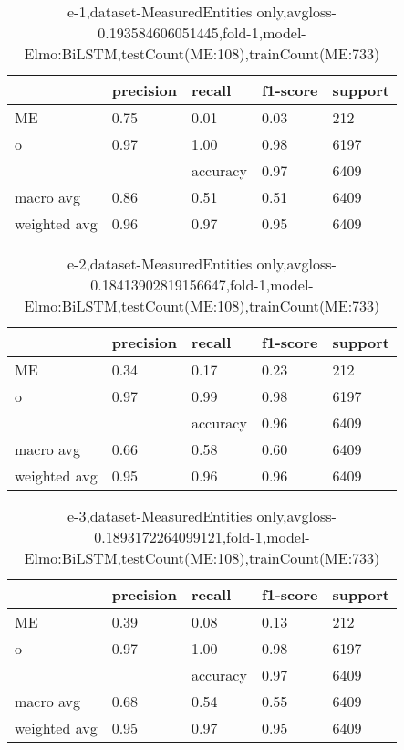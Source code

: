 \begin{table}[!ht] 
\centering
\caption{e-1,dataset-MeasuredEntities only,avgloss-0.193584606051445,fold-1,model-Elmo:BiLSTM,testCount(ME:108),trainCount(ME:733)}\label{e-1data-meS.tsv}
\begin{tabularx}{300pt}{|X|X|X|X|X|}
\hline
&precision&recall&f1-score&support\\
\hline
ME&0.75&0.01&0.03&212\\
\hline
o&0.97&1.00&0.98&6197\\
\hline
&&accuracy&0.97&6409\\
\hline
macro avg&0.86&0.51&0.51&6409\\
\hline
weighted avg&0.96&0.97&0.95&6409\\
\hline
\end{tabularx}
\end{table}
\begin{table}[!ht] 
\centering
\caption{e-2,dataset-MeasuredEntities only,avgloss-0.18413902819156647,fold-1,model-Elmo:BiLSTM,testCount(ME:108),trainCount(ME:733)}\label{e-2data-meS.tsv}
\begin{tabularx}{300pt}{|X|X|X|X|X|}
\hline
&precision&recall&f1-score&support\\
\hline
ME&0.34&0.17&0.23&212\\
\hline
o&0.97&0.99&0.98&6197\\
\hline
&&accuracy&0.96&6409\\
\hline
macro avg&0.66&0.58&0.60&6409\\
\hline
weighted avg&0.95&0.96&0.96&6409\\
\hline
\end{tabularx}
\end{table}
\begin{table}[!ht] 
\centering
\caption{e-3,dataset-MeasuredEntities only,avgloss-0.1893172264099121,fold-1,model-Elmo:BiLSTM,testCount(ME:108),trainCount(ME:733)}\label{e-3data-meS.tsv}
\begin{tabularx}{300pt}{|X|X|X|X|X|}
\hline
&precision&recall&f1-score&support\\
\hline
ME&0.39&0.08&0.13&212\\
\hline
o&0.97&1.00&0.98&6197\\
\hline
&&accuracy&0.97&6409\\
\hline
macro avg&0.68&0.54&0.55&6409\\
\hline
weighted avg&0.95&0.97&0.95&6409\\
\hline
\end{tabularx}
\end{table}
